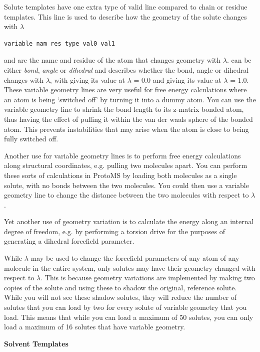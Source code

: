 \documentclass[letterpaper,10pt,english]{manual}
\begin{document}
Solute templates have one extra type of valid line compared to chain or residue templates. This line is used to describe how the geometry of the solute changes with $\lambda$

\begin{Verbatim}[commandchars=@\[\]]
variable nam res type val0 val1
\end{Verbatim}

 and  are the name and residue of the atom that changes geometry with $\lambda$.  can be either \emph{bond}, \emph{angle} or \emph{dihedral} and describes whether the bond, angle or dihedral changes with $\lambda$, with  giving its value at $\lambda$ = 0.0 and  giving its value at $\lambda$ = 1.0. These variable geometry lines are very useful for free energy calculations where an atom is being ‘switched off’ by turning it into a dummy atom. You can use the variable geometry line to shrink the bond length to its z-matrix bonded atom, thus having the effect of pulling it within the van der waals sphere of the bonded atom. This prevents instabilities that may arise when the atom is close to being fully switched off.

Another use for variable geometry lines is to perform free energy calculations along structural coordinates, e.g. pulling two molecules apart. You can perform these sorts of calculations in ProtoMS by loading both molecules as a single solute, with no bonds between the two molecules. You could then use a variable geometry line to change the distance between the two molecules with respect to $\lambda$.

Yet another use of geometry variation is to calculate the energy along an internal degree of freedom, e.g. by performing a torsion drive for the purposes of generating a dihedral forcefield parameter.

While $\lambda$ may be used to change the forcefield parameters of any atom of any molecule in the entire system, only solutes may have their geometry changed with respect to $\lambda$. This is because geometry variations are implemented by making two copies of the solute and using these to shadow the original, reference solute. While you will not see these shadow solutes, they will reduce the number of solutes that you can load by two for every solute of variable geometry that you load. This means that while you can load a maximum of 50 solutes, you can only load a maximum of 16 solutes that have variable geometry.

\textbf{Solvent Templates}
\end{document}
